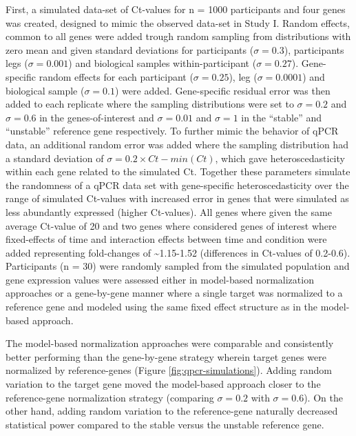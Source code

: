 \documentclass[twoside,10pt]{gihclass} %
\begin{document}
First, a simulated data-set of Ct-values for n = 1000 participants and four genes was created, designed to mimic the observed data-set in Study I. Random effects, common to all genes were added trough random sampling from distributions with zero mean and given standard deviations for participants (\(\sigma = 0.3\)), participants legs (\(\sigma = 0.001\)) and biological samples within-participant (\(\sigma = 0.27\)). Gene-specific random effects for each participant (\(\sigma = 0.25\)), leg (\(\sigma = 0.0001\)) and biological sample (\(\sigma = 0.1\)) were added. Gene-specific residual error was then added to each replicate where the sampling distributions were set to \(\sigma=0.2\) and \(\sigma=0.6\) in the genes-of-interest and \(\sigma=0.01\) and \(\sigma=1\) in the ``stable'' and ``unstable'' reference gene respectively. To further mimic the behavior of qPCR data, an additional random error was added where the sampling distribution had a standard deviation of \(\sigma = 0.2 \times Ct-min(Ct)\), which gave heteroscedasticity within each gene related to the simulated Ct. Together these parameters simulate the randomness of a qPCR data set with gene-specific heteroscedasticity over the range of simulated Ct-values with increased error in genes that were simulated as less abundantly expressed (higher Ct-values).
All genes where given the same average Ct-value of 20 and two genes where considered genes of interest where fixed-effects of time and interaction effects between time and condition were added representing fold-changes of \textasciitilde1.15-1.52 (differences in Ct-values of 0.2-0.6). Participants (n = 30) were randomly sampled from the simulated population and gene expression values were assessed either in model-based normalization approaches or a gene-by-gene manner where a single target was normalized to a reference gene and modeled using the same fixed effect structure as in the model-based approach.

The model-based normalization approaches were comparable and consistently better performing than the gene-by-gene strategy wherein target genes were normalized by reference-genes (Figure \ref{fig:qpcr-simulations}). Adding random variation to the target gene moved the model-based approach closer to the reference-gene normalization strategy (comparing \(\sigma=0.2\) with \(\sigma=0.6\)). On the other hand, adding random variation to the reference-gene naturally decreased statistical power compared to the stable versus the unstable reference gene.
\end{document}
